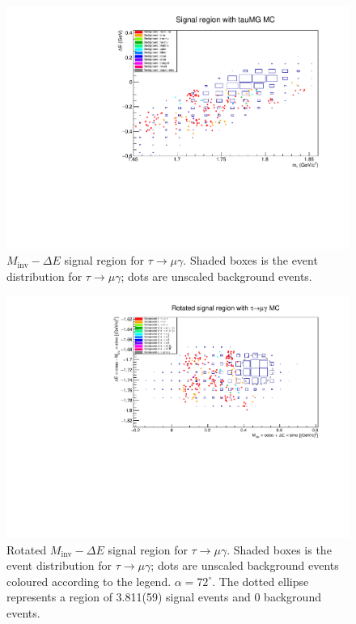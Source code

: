 \documentclass[12pt]{thesis}  %
\begin{document}
\begin{figure}[h]
\centering
\includegraphics[width=0.9\linewidth]{images/tauMG-signalRegion.pdf}
\caption[]%
{{\small $M_{\text{inv}}-\Delta E$ signal region for $\tau\to\mu\gamma$. Shaded boxes is the event distribution for $\tau\to\mu\gamma$; dots are unscaled background events.}}
\label{fig:tauMG signal region}
\end{figure}

\begin{figure}[h]
\centering
\includegraphics[width=\linewidth]{images/tauMG-signalRegionRotated.pdf}
\caption[]%
{{\small Rotated $M_{\text{inv}}-\Delta E$ signal region for $\tau\to\mu\gamma$. Shaded boxes is the event distribution for $\tau\to\mu\gamma$; dots are unscaled background events coloured according to the legend. $\alpha = 72^{\circ}$. The dotted ellipse represents a region of 3.811(59) signal events and 0 background events.}}
\label{}
\end{figure}
\end{document}
